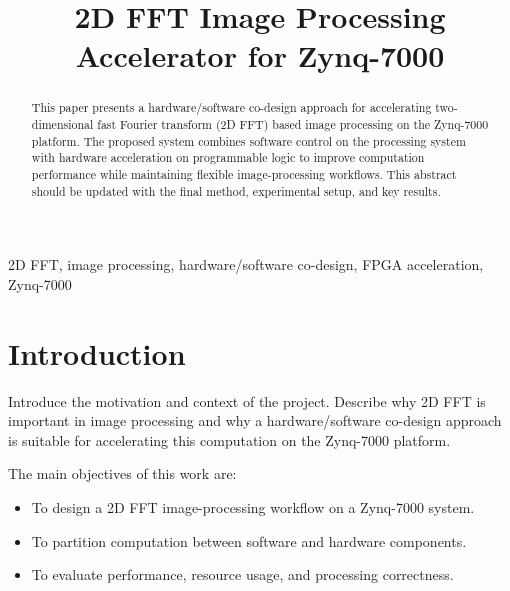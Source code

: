 \documentclass[conference]{IEEEtran}
\begin{document}
\title{2D FFT Image Processing Accelerator for Zynq-7000}

\author{
}

\maketitle

\begin{abstract}
    This paper presents a hardware/software co-design approach for accelerating two-dimensional fast Fourier transform (2D FFT) based image processing on the Zynq-7000 platform. The proposed system combines software control on the processing system with hardware acceleration on programmable logic to improve computation performance while maintaining flexible image-processing workflows. This abstract should be updated with the final method, experimental setup, and key results.
\end{abstract}

\begin{IEEEkeywords}
    2D FFT, image processing, hardware/software co-design, FPGA acceleration, Zynq-7000
\end{IEEEkeywords}

\section{Introduction}
Introduce the motivation and context of the project. Describe why 2D FFT is important in image processing and why a hardware/software co-design approach is suitable for accelerating this computation on the Zynq-7000 platform.

The main objectives of this work are:
\begin{itemize}
    \item To design a 2D FFT image-processing workflow on a Zynq-7000 system.
    \item To partition computation between software and hardware components.
    \item To evaluate performance, resource usage, and processing correctness.
\end{itemize}
\end{document}
